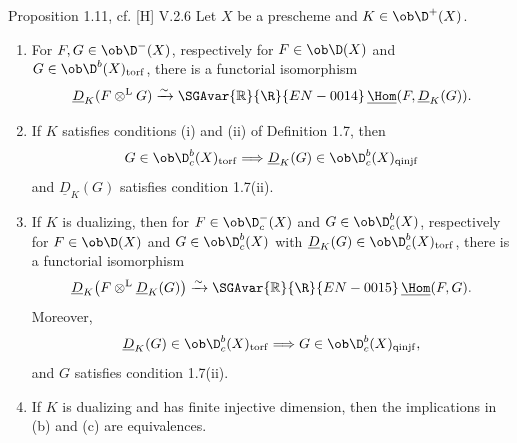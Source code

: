 \begin{statement}{Proposition 1.11, cf. [H] V.2.6}
Let $X$ be a prescheme and $K\in\ob\D^+(X)$.
\begin{enumerate}[label=\alph*)]
\item For $F,G\in\ob\D^-(X)$, respectively for $F\in\ob\D(X)$ and $G\in\ob\D^b(X)_{\mathrm{torf}}$, there is a functorial isomorphism
\[
   \underline D_K(F\otimes^{\mathrm L}G)\xrightarrow{\sim}
   \SGAvar{\mathbb{R}}{\R}{EN-0014}\,\underline{\Hom}(F,\underline D_K(G)).
\]

\item If $K$ satisfies conditions (i) and (ii) of Definition 1.7, then
\[
   G\in\ob\D_c^b(X)_{\mathrm{torf}}
   \Longrightarrow
   \underline D_K(G)\in\ob\D_c^b(X)_{\mathrm{qinjf}}
\]
and $\underline D_K(G)$ satisfies condition 1.7(ii).

\item If $K$ is dualizing, then for $F\in\ob\D_c^-(X)$ and $G\in\ob\D_c^b(X)$, respectively for $F\in\ob\D(X)$ and $G\in\ob\D_c^b(X)$ with $\underline D_K(G)\in\ob\D_c^b(X)_{\mathrm{torf}}$, there is a functorial isomorphism
\[
   \underline D_K\bigl(F\otimes^{\mathrm L}\underline D_K(G)\bigr)
      \xrightarrow{\sim}\SGAvar{\mathbb{R}}{\R}{EN-0015}\,\underline{\Hom}(F,G).
\]
Moreover,
\[
   \underline D_K(G)\in\ob\D_c^b(X)_{\mathrm{torf}}
   \Longrightarrow
   G\in\ob\D_c^b(X)_{\mathrm{qinjf}},
\]
and $G$ satisfies condition 1.7(ii).

\item If $K$ is dualizing and has finite injective dimension, then the implications in (b) and (c) are equivalences.
\end{enumerate}
\end{statement}

